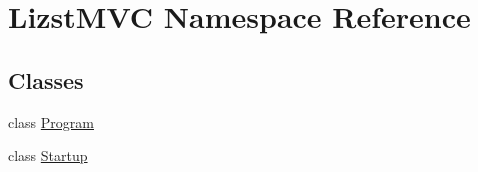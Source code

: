 \hypertarget{namespace_lizst_m_v_c}{}\section{Lizst\+M\+VC Namespace Reference}
\label{namespace_lizst_m_v_c}
\subsection*{Classes}
\begin{DoxyCompactItemize}
\item 
class \mbox{\hyperlink{class_lizst_m_v_c_1_1_program}{Program}}
\item 
class \mbox{\hyperlink{class_lizst_m_v_c_1_1_startup}{Startup}}
\end{DoxyCompactItemize}
